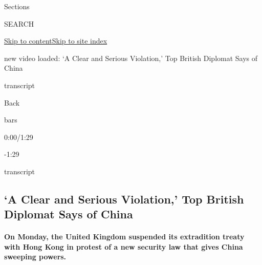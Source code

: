 Sections

SEARCH

\protect\hyperlink{site-content}{Skip to
content}\protect\hyperlink{site-index}{Skip to site index}

new video loaded: `A Clear and Serious Violation,' Top British Diplomat
Says of China

transcript

Back

bars

0:00/1:29

-1:29

transcript

\hypertarget{a-clear-and-serious-violation-top-british-diplomat-says-of-china}{%
\subsection{`A Clear and Serious Violation,' Top British Diplomat Says
of
China}\label{a-clear-and-serious-violation-top-british-diplomat-says-of-china}}

\hypertarget{on-monday-the-united-kingdom-suspended-its-extradition-treaty-with-hong-kong-in-protest-of-a-new-security-law-that-gives-china-sweeping-powers}{%
\paragraph{On Monday, the United Kingdom suspended its extradition
treaty with Hong Kong in protest of a new security law that gives China
sweeping
powers.}\label{on-monday-the-united-kingdom-suspended-its-extradition-treaty-with-hong-kong-in-protest-of-a-new-security-law-that-gives-china-sweeping-powers}}

